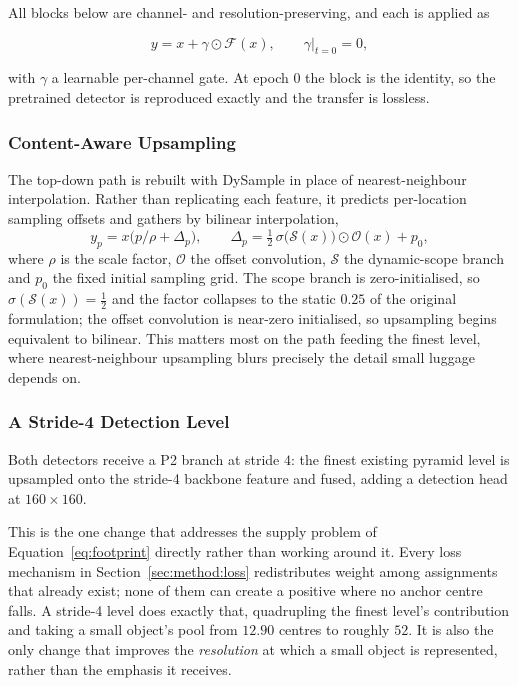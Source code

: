 \documentclass[10pt,twocolumn,a4paper]{article}
\begin{document}
All blocks below are channel- and resolution-preserving, and each is applied as

\begin{equation}
y = x + \gamma \odot \mathcal{F}(x), \qquad \gamma \big|_{t=0} = 0,
\label{eq:gate}
\end{equation}

\noindent with $\gamma$ a learnable per-channel gate. At epoch $0$ the block is
the identity, so the pretrained detector is reproduced exactly and the transfer
is lossless.

\subsubsection{Content-Aware Upsampling}

The top-down path is rebuilt with DySample \cite{dysample2023} in place of
nearest-neighbour interpolation. Rather than replicating each feature, it
predicts per-location sampling offsets and gathers by bilinear interpolation,
\begin{equation}
y_p = x\bigl(p/\rho + \Delta_p\bigr), \qquad
\Delta_p = \tfrac{1}{2}\,\sigma\bigl(\mathcal{S}(x)\bigr) \odot \mathcal{O}(x) + p_0 ,
\label{eq:dysample}
\end{equation}
where $\rho$ is the scale factor, $\mathcal{O}$ the offset convolution,
$\mathcal{S}$ the dynamic-scope branch and $p_0$ the fixed initial sampling
grid. The scope branch is zero-initialised, so $\sigma(\mathcal{S}(x)) =
\tfrac12$ and the factor collapses to the static $0.25$ of the original
formulation; the offset convolution is near-zero initialised, so upsampling
begins equivalent to bilinear. This
matters most on the path feeding the finest level, where nearest-neighbour
upsampling blurs precisely the detail small luggage depends on.

\subsubsection{A Stride-4 Detection Level}

Both detectors receive a P2 branch at stride $4$: the finest existing pyramid
level is upsampled onto the stride-4 backbone feature and fused, adding a
detection head at $160\times160$.

This is the one change that addresses the supply problem of
Equation~\eqref{eq:footprint} directly rather than working around it. Every loss
mechanism in Section~\ref{sec:method:loss} redistributes weight among
assignments that already exist; none of them can create a positive where no
anchor centre falls. A stride-4 level does exactly that, quadrupling the finest
level's contribution and taking a small object's pool from $12.90$ centres to
roughly $52$. It is also the only change that improves the \emph{resolution} at
which a small object is represented, rather than the emphasis it receives.
\end{document}
